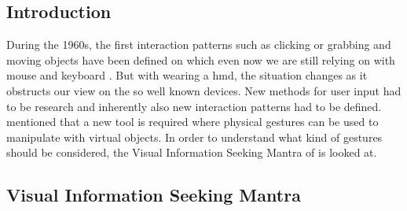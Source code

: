 
\subsection{Introduction}

During the 1960s, the first interaction patterns such as clicking or grabbing and moving objects have been defined on which even now we are still relying on with mouse and keyboard \citep{Myers1998}. But with wearing a \gls{hmd}, the situation changes as it obstructs our view on the so well known devices. New methods for user input had to be research and inherently also new interaction patterns had to be defined. \cite{Donalek2014} mentioned that a new tool is required where physical gestures can be used to manipulate with virtual objects. In order to understand what kind of gestures should be considered, the Visual Information Seeking Mantra of \cite{Shneiderman1996} is looked at.



\subsection{Visual Information Seeking Mantra}

